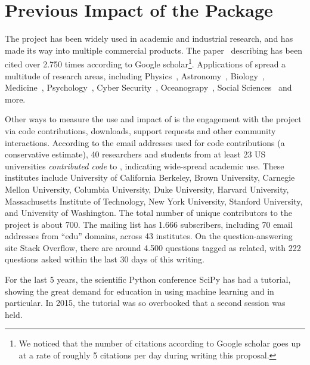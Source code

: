 \section{Previous Impact of the \sklearn{} Package}
The \sklearn{} project has been widely used in academic and industrial research,
and has made its way into multiple commercial products. The
paper~\autocite{pedregosa2011scikit} describing \sklearn{} has been cited over 2.750 times
according to Google scholar\footnote{We noticed that the number of citations
according to Google scholar goes up at a rate of roughly 5 citations per day
during writing this proposal.}. Applications of \sklearn{} spread a multitude
of research areas, including Physics~\autocite{Baldi:2016fql, Yang:2016nnd},
Astronomy~\autocite{pereira2013spectrophotometric, bennett20141},
Biology~\autocite{misof2014phylogenomics, ritchie2014functional},
Medicine~\autocite{kamalov2015improving, ng2015computer},
Psychology~\autocite{park2015automatic,doehrmann2013predicting}, Cyber
Security~\autocite{sahs2012machine},
Oceanograpy~\autocite{sunagawa2015structure}, Social
Sciences~\autocite{driscoll2015searching, croicu2015improving} and more.

Other ways to measure the use and impact of \sklearn{} is the engagement with
the project via code contributions, downloads, support requests and other
community interactions.
According to the email addresses used for code contributions (a conservative
estimate), 40 researchers and students from at least 23 US universities
\emph{contributed code} to \sklearn{}, indicating wide-spread academic use.
These institutes include University of California Berkeley, Brown University,
Carnegie Mellon University, Columbia University, Duke University, Harvard
University, Massachusetts Institute of Technology, New York University,
Stanford University, and University of Washington.
The total number of unique contributors to the project is about 700.
%
The \sklearn{} mailing list has 1.666 subscribers, including 70 email
addresses from ``edu'' domains, across 43 institutes.
%
On the question-answering site Stack Overflow, there are around 4.500 questions
tagged as \sklearn{} related, with 222 questions asked within the last 30
days of this writing.

For the last 5 years, the scientific Python conference SciPy has had a \sklearn{} tutorial,
showing the great demand for education in using machine learning and \sklearn{} in particular.
In 2015, the tutorial was so overbooked that a second session was held.

